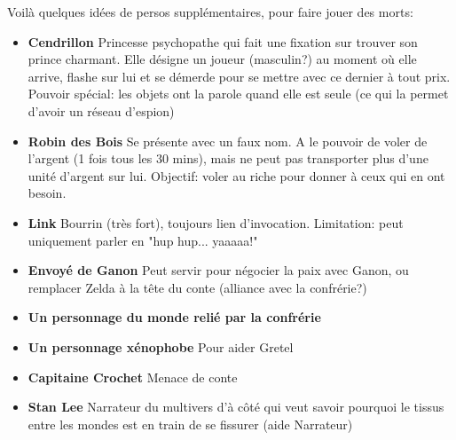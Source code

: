 {	Voilà quelques idées de persos supplémentaires, pour faire jouer des morts:
	\begin{itemize}
		\item \textbf{Cendrillon} Princesse psychopathe qui fait une fixation sur trouver son prince charmant. Elle désigne un joueur (masculin?) au moment où elle arrive, flashe sur lui et se démerde pour se mettre avec ce dernier à tout prix. Pouvoir spécial: les objets ont la parole quand elle est seule (ce qui la permet d'avoir un réseau d'espion)
	
		\item \textbf{Robin des Bois} Se présente avec un faux nom. A le pouvoir de voler de l'argent (1 fois tous les 30 mins), mais ne peut pas transporter plus d'une unité d'argent sur lui. Objectif: voler au riche pour donner à ceux qui en ont besoin.
	
		\item \textbf{Link} Bourrin (très fort), toujours lien d'invocation. Limitation: peut uniquement parler en "hup hup... yaaaaa!"
	
		\item \textbf{Envoyé de Ganon} Peut servir pour négocier la paix avec Ganon, ou remplacer Zelda à la tête du conte (alliance avec la confrérie?)
	
		\item \textbf{Un personnage du monde relié par la confrérie}
	
		\item \textbf{Un personnage xénophobe} Pour aider Gretel
	
		\item \textbf{Capitaine Crochet} Menace de conte
	
		\item \textbf{Stan Lee} Narrateur du multivers d'à côté qui veut savoir pourquoi le tissus entre les mondes est en train de se fissurer (aide Narrateur)
	\end{itemize}
		
}









